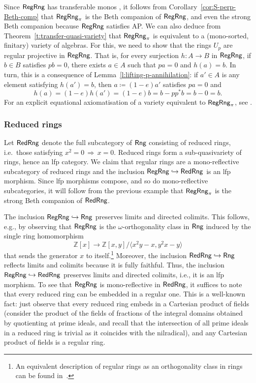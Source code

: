 \documentclass[a4paper,10pt,reqno]{amsart}
\theoremstyle{definition}
\theoremstyle{remark}
\newcommand{\Z}{\mathbb{Z}}				%
\newcommand{\Rng}{{\sf Rng}}								%
\newcommand{\RegRng}{{\sf RegRng}}						%
\newcommand{\RedRng}{{\sf RedRng}}						%
\newcommand{\into}{\hookrightarrow}						%
\newcommand{\IMP}{\Rightarrow}						%
\newcommand{\AP}{\textnormal{AP}}
\begin{document}
Since $\RegRng$ has transferable monos \cite[Theorem~1.6]{Cornish1977}, it follows from Corollary~\ref{cor:S-perp-Beth-comp} that $\RegRng_{\pi}$ is the Beth companion of $\RegRng$, and even the strong Beth companion because $\RegRng$ satisfies \AP. We can also deduce from Theorem~\ref{t:transfer-quasi-variety} that $\RegRng_{\pi}$ is equivalent to a (mono-sorted, finitary) variety of algebras. For this, we need to show that the rings $U_{p}$ are regular projective in $\RegRng$. That is, for every surjection $h\colon A\to B$ in $\RegRng$, if $b\in B$ satisfies $pb=0$, there exists $a\in A$ such that $pa=0$ and $h(a)=b$. In turn, this is a consequence of Lemma~\ref{l:lifting-p-annihilation}: if $a'\in A$ is any element satisfying $h(a')=b$, then $a\coloneqq (1-e)a'$ satisfies $pa=0$ and
\[
h(a)=(1-e)h(a')=(1-e)b=b - pp^{*}b = b-0 =b.
\]
For an explicit equational axiomatisation of a variety equivalent to $\RegRng_{\pi}$, see \cite[Theorem~3.14]{CKM2026rings}.  
%



\subsubsection*{Reduced rings}
%
Let $\RedRng$ denote the full subcategory of $\Rng$ consisting of reduced rings, i.e.\ those satisfying $x^{2}=0 \, \IMP \, x=0$. Reduced rings form a sub-quasivariety of rings, hence an lfp category. We claim that regular rings are a mono-reflective subcategory of reduced rings and the inclusion $\RegRng\into \RedRng$ is an lfp morphism. Since lfp morphisms compose, and so do mono-reflective subcategories, it will follow from the previous example that $\RegRng_{\pi}$ is the strong Beth companion of $\RedRng$.

The inclusion $\RegRng\into \Rng$ preserves limits and directed colimits. This follows, e.g., by observing that $\RegRng$ is the $\omega$-orthogonality class in $\Rng$ induced by the single ring homomorphism
\[
\Z[x] \to \Z[x,y]/\langle x^{2}y-x, y^{2}x-y\rangle
\]
that sends the generator $x$ to itself.\footnote{An equivalent description of regular rings as an orthogonality class in rings can be found in~\cite[Proposition~4.41]{BSY}.}
%
Moreover, the inclusion $\RedRng\into \Rng$ reflects limits and colimits because it is fully faithful. Thus, the inclusion $\RegRng\into \RedRng$ preserves limits and directed colimits, i.e., it is an lfp morphism. To see that $\RegRng$ is mono-reflective in $\RedRng$, it suffices to note that every reduced ring can be embedded in a regular one. This is a well-known fact: just observe that every reduced ring embeds in a Cartesian product of fields (consider the product of the fields of fractions of the integral domains obtained by quotienting at prime ideals, and recall that the intersection of all prime ideals in a reduced ring is trivial as it coincides with the nilradical), and any Cartesian product of fields is a regular ring.
\end{document}
